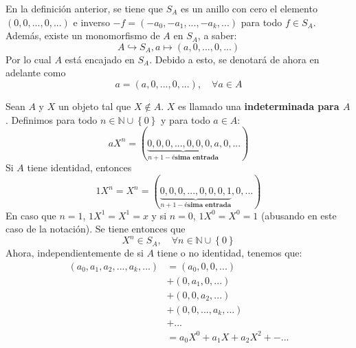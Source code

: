 \documentclass[12pt]{report}
\theoremstyle{largebreak}
\begin{document}
    \begin{obs}
        En la definición anterior, se tiene que $S_A$ es un anillo con cero el elemento $(0,0,...,0,...)$ e inverso $-f=(-a_0,-a_1,...,-a_k,...)$ para todo $f\in S_A$. Además, existe un monomorfismo de $A$ en $S_A$, a saber:
        \begin{equation*}
            A\hookrightarrow S_A, a\mapsto (a,0,...,0,...)
        \end{equation*}
        Por lo cual $A$ está encajado en $S_A$. Debido a esto, se denotará de ahora en adelante como
        \begin{equation*}
            a=(a,0,...,0,...),\quad\forall a\in A
        \end{equation*}
    \end{obs}

    \begin{mydef}
        Sean $A$ y $X$ un objeto tal que $X\notin A$. $X$ es llamado una \textbf{indeterminada para $A$}. Definimos para todo $n\in\mathbb{N}\cup\left\{0\right\}$ y para todo $a\in A$:
        \begin{equation*}
            aX^n=(\underbrace{0,0,0,...,0,0,0,a}_{{n+1}-\textbf{ésima entrada}},0,...)
        \end{equation*}
        Si $A$ tiene identidad, entonces
        \begin{equation*}
            1X^n=X^n=(\underbrace{0,0,0,...,0,0,0,1}_{{n+1}-\textbf{ésima entrada}},0,...)
        \end{equation*}
        En caso que $n=1$, $1X^1=X^1=x$ y si $n=0$, $1X^0=X^0=1$ (abusando en este caso de la notación). Se tiene entonces que
        \begin{equation*}
            X^n\in S_A,\quad\forall n\in\mathbb{N}\cup\left\{0\right\}
        \end{equation*}
        Ahora, independientemente de si $A$ tiene o no identidad, tenemos que:
        \begin{equation*}
            \begin{split}
                (a_0,a_1,a_2,...,a_k,...)&=(a_0,0,0,...)\\
                &+(0,a_1,0,...)\\
                &+(0,0,a_2,...)\\
                &+(0,0,...,a_k,...)\\
                &+...\\
                &=a_0X^0+a_1X+a_2X^2+-...\\
            \end{split}

\end{equation*}
\end{mydef}
\end{document}
